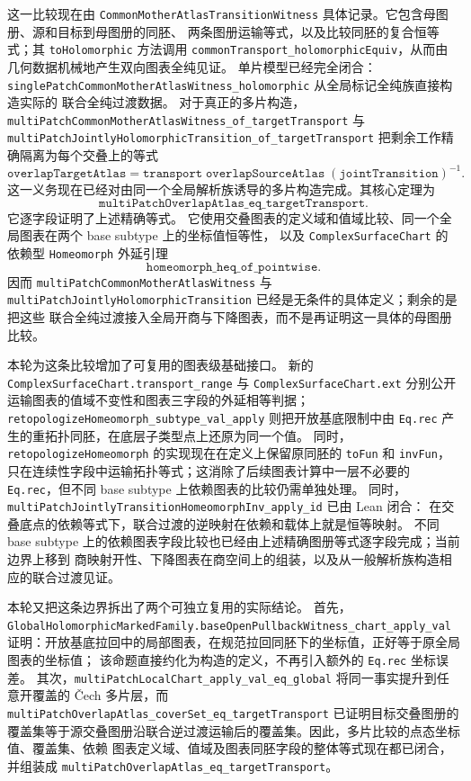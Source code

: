 \documentclass[UTF8,fontset=none,a4paper,11pt]{ctexart}
\begin{document}
这一比较现在由
\texttt{CommonMother\allowbreak Atlas\allowbreak Transition\allowbreak Witness} 具体记录。它包含母图册、源和目标到母图册的同胚、
两条图册运输等式，以及比较同胚的复合恒等式；其
\texttt{toHolomorphic} 方法调用
\texttt{commonTransport\_holomorphic\allowbreak Equiv}，从而由几何数据机械地产生双向图表全纯见证。
单片模型已经完全闭合：
\texttt{singlePatch\allowbreak CommonMother\allowbreak AtlasWitness\allowbreak \_holomorphic} 从全局标记全纯族直接构造实际的
联合全纯过渡数据。
对于真正的多片构造，
\texttt{multiPatch\allowbreak CommonMotherAtlasWitness\allowbreak \_of\_target\allowbreak Transport} 与
\texttt{multiPatch\allowbreak JointlyHolomorphicTransition\allowbreak \_of\_target\allowbreak Transport}
把剩余工作精确隔离为每个交叠上的等式
\[
  \texttt{overlapTargetAtlas}
  =
  \texttt{transport}\;\texttt{overlapSourceAtlas}\;(\texttt{jointTransition})^{-1}.
\]
这一义务现在已经对由同一个全局解析族诱导的多片构造完成。其核心定理为
\[
  \texttt{multiPatchOverlapAtlas\_eq\_targetTransport}.
\]
它逐字段证明了上述精确等式。
它使用交叠图表的定义域和值域比较、同一个全局图表在两个 base subtype 上的坐标值恒等性，
以及 \texttt{ComplexSurfaceChart} 的依赖型 \texttt{Homeomorph} 外延引理
\[
  \texttt{homeomorph\_heq\_of\_pointwise}.
\]
因而
\texttt{multiPatchCommonMotherAtlasWitness} 与
\texttt{multiPatchJointlyHolomorphicTransition} 已经是无条件的具体定义；剩余的是把这些
联合全纯过渡接入全局开商与下降图表，而不是再证明这一具体的母图册比较。

本轮为这条比较增加了可复用的图表级基础接口。
新的 
\texttt{ComplexSurfaceChart.\allowbreak transport\_range} 与
\texttt{ComplexSurfaceChart.ext} 分别公开运输图表的值域不变性和图表三字段的外延相等判据；
\texttt{retopologizeHomeomorph\_subtype\_val\_apply} 则把开放基底限制中由
\texttt{Eq.rec} 产生的重拓扑同胚，在底层子类型点上还原为同一个值。
同时，\texttt{retopologizeHomeomorph} 的实现现在在定义上保留原同胚的
\texttt{toFun} 和 \texttt{invFun}，只在连续性字段中运输拓扑等式；这消除了后续图表计算中一层不必要的
\texttt{Eq.rec}，但不同 base subtype 上依赖图表的比较仍需单独处理。
同时，\texttt{multiPatchJointlyTransitionHomeomorphInv\_apply\_id} 已由 Lean 闭合：
在交叠底点的依赖等式下，联合过渡的逆映射在依赖和载体上就是恒等映射。
不同 base subtype 上的依赖图表字段比较也已经由上述精确图册等式逐字段完成；当前边界上移到
商映射开性、下降图表在商空间上的组装，以及从一般解析族构造相应的联合过渡见证。

本轮又把这条边界拆出了两个可独立复用的实际结论。
首先，\texttt{GlobalHolomorphicMarked\allowbreak Family.\allowbreak baseOpenPullbackWitness\_chart\_apply\_val}
证明：开放基底拉回中的局部图表，在规范拉回同胚下的坐标值，正好等于原全局图表的坐标值；
该命题直接约化为构造的定义，不再引入额外的 \texttt{Eq.rec} 坐标误差。
其次，\texttt{multiPatchLocalChart\allowbreak\_apply\allowbreak\_val\allowbreak\_eq\allowbreak\_global} 将同一事实提升到任意开覆盖的
Čech 多片层，而 \texttt{multiPatchOverlapAtlas\allowbreak\_coverSet\allowbreak\_eq\allowbreak\_target\allowbreak Transport} 已证明目标交叠图册的
覆盖集等于源交叠图册沿联合逆过渡运输后的覆盖集。因此，多片比较的点态坐标值、覆盖集、依赖
图表定义域、值域及图表同胚字段的整体等式现在都已闭合，并组装成
\texttt{multiPatchOverlapAtlas\_eq\_targetTransport}。
\end{document}
